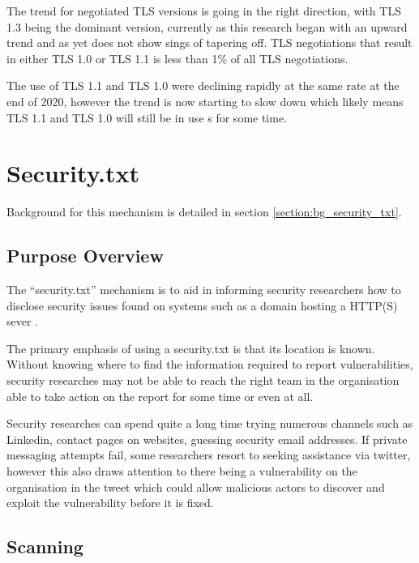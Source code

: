 \documentclass{mscreport}
\begin{document}
\noindent
The trend for negotiated TLS versions is going in the right direction, with TLS 1.3 being the dominant version, currently as this research began with an upward trend and as yet does not show sings of tapering off. TLS negotiations that result in either TLS 1.0 or TLS 1.1 is less than 1\% of all TLS negotiations.

\vspace{0.3cm} \noindent
The use of TLS 1.1 and TLS 1.0 were declining rapidly at the same rate at the end of 2020, however the trend is now starting to slow down which likely means TLS 1.1 and TLS 1.0 will still be in use s for some time.




\clearpage
\newpage

\section{Security.txt}
\label{section:ana_security_txt}

Background for this mechanism is detailed in section \ref{section:bg_security_txt}.

\subsection{Purpose Overview}

\noindent
The ``security.txt'' mechanism is to aid in informing security researchers how to disclose security issues found on systems such as a domain hosting a HTTP(S) sever \cite{Foudil2021-vh}.

\vspace{0.3cm} \noindent
The primary emphasis of using a security.txt is that its location is known. Without knowing where to find the information required to report vulnerabilities, security researches may not be able to reach the right team in the organisation able to take action on the report for some time or even at all.

\vspace{0.3cm} \noindent
Security researches can spend quite a long time trying numerous channels such as Linkedin, contact pages on websites, guessing security email addresses. If private messaging attempts fail, some researchers resort to seeking assistance via twitter, however this also draws attention to there being a vulnerability on the organisation in the tweet which could allow malicious actors to discover and exploit the vulnerability before it is fixed.

\subsection{Scanning}
\end{document}
